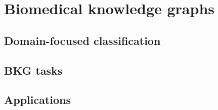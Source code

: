 
\chapter{Biomedical knowledge graphs}\label{kgs:biomed}

\section{Domain-focused classification}
\section{BKG tasks}
\section{Applications}